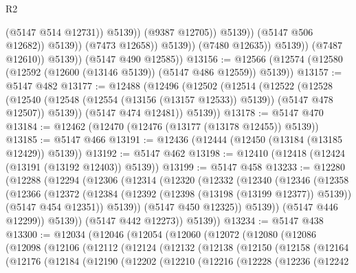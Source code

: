 \begin{lexlean}{R2}
\begin{coremodule}
                                          (@5147 @514 @12731))
                                        @5139))
                                    (@9387 @12705))
                                  @5139))
                              (@5147 @506 @12682))
                            @5139))
                        (@7473 @12658))
                      @5139))
                  (@7480 @12635))
                @5139))
            (@7487 @12610))
          @5139))
      (@5147 @490 @12585))
@13156 := @12566 (@12574 (@12580 (@12592 (@12600 (@13146 @5139)) (@5147 @486 @12559)) @5139))
@13157 := @5147 @482
@13177 := @12488
    (@12496
      (@12502
        (@12514
          (@12522
            (@12528
              (@12540 (@12548 (@12554 (@13156 (@13157 @12533)) @5139)) (@5147 @478 @12507))
              @5139))
          (@5147 @474 @12481))
        @5139))
@13178 := @5147 @470
@13184 := @12462 (@12470 (@12476 (@13177 (@13178 @12455)) @5139))
@13185 := @5147 @466
@13191 := @12436 (@12444 (@12450 (@13184 (@13185 @12429)) @5139))
@13192 := @5147 @462
@13198 := @12410 (@12418 (@12424 (@13191 (@13192 @12403)) @5139))
@13199 := @5147 @458
@13233 := @12280
    (@12288
      (@12294
        (@12306
          (@12314
            (@12320
              (@12332
                (@12340
                  (@12346
                    (@12358
                      (@12366
                        (@12372
                          (@12384
                            (@12392 (@12398 (@13198 (@13199 @12377)) @5139))
                            (@5147 @454 @12351))
                          @5139))
                      (@5147 @450 @12325))
                    @5139))
                (@5147 @446 @12299))
              @5139))
          (@5147 @442 @12273))
        @5139))
@13234 := @5147 @438
@13300 := @12034
    (@12046
      (@12054
        (@12060
          (@12072
            (@12080
              (@12086
                (@12098
                  (@12106
                    (@12112
                      (@12124
                        (@12132
                          (@12138
                            (@12150
                              (@12158
                                (@12164
                                  (@12176
                                    (@12184
                                      (@12190
                                        (@12202
                                          (@12210
                                            (@12216
                                              (@12228
                                                (@12236
                                                  (@12242

\end{coremodule}
\end{lexlean}
